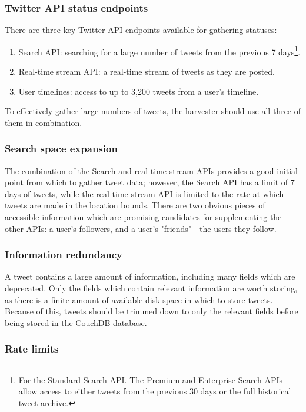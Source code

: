 \subsubsection{Twitter API status endpoints}

There are three key Twitter API endpoints available for gathering statuses:
\begin{enumerate}
    \item Search API: searching for a large number of tweets from the previous 7 days\footnote{For the Standard Search API. The Premium and Enterprise Search APIs allow access to either tweets from the previous 30 days or the full historical tweet archive.}.
    \item Real-time stream API: a real-time stream of tweets as they are posted.
    \item User timelines: access to up to 3,200 tweets from a user's timeline.
\end{enumerate}

To effectively gather large numbers of tweets, the harvester should use all three of them in combination.

\subsubsection{Search space expansion}

The combination of the Search and real-time stream APIs provides a good initial point from which to gather tweet data; however, the Search API has a limit of 7 days of tweets, while the real-time stream API is limited to the rate at which tweets are made in the location bounds. There are two obvious pieces of accessible information which are promising candidates for supplementing the other APIs: a user's followers, and a user's "friends"---the users they follow.

\subsubsection{Information redundancy}

A tweet contains a large amount of information, including many fields which are deprecated. Only the fields which contain relevant information are worth storing, as there is a finite amount of available disk space in which to store tweets. Because of this, tweets should be trimmed down to only the relevant fields before being stored in the CouchDB database.

\subsubsection{Rate limits}

